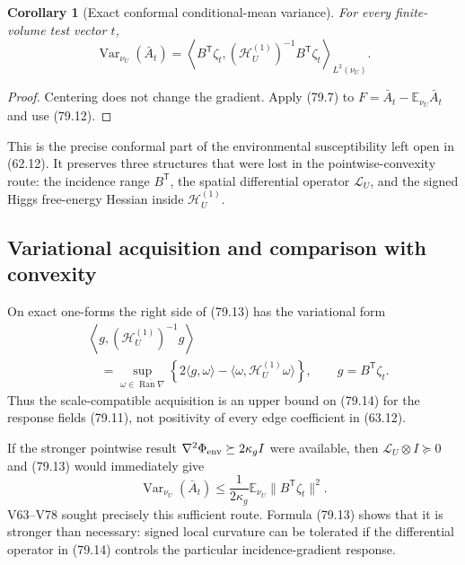 \documentclass[11pt]{article}
\newtheorem{corollary}[theorem]{Corollary}
\theoremstyle{remark}
\begin{document}
\begin{corollary}[Exact conformal conditional-mean variance]
\label{cor:v17v79-response}
For every finite-volume test vector \(t\),
\[
\boxed{
 \operatorname{Var}_{\nu_U}(\bar A_t)
 =\left\langle
 B^{\mathsf T}\zeta_t,
 (\mathscr H_U^{(1)})^{-1}B^{\mathsf T}\zeta_t
 \right\rangle_{L^2(\nu_U)}.}                   \tag{79.13}
\]
\end{corollary}

\begin{proof}
Centering does not change the gradient.  Apply (79.7) to
\(F=\bar A_t-\mathbb E_{\nu_U}\bar A_t\) and use (79.12).
\end{proof}

This is the precise conformal part of the environmental susceptibility
left open in (62.12).  It preserves three structures that were lost in
the pointwise-convexity route: the incidence range
\(B^{\mathsf T}\), the spatial differential operator
\(\mathscr L_U\), and the signed Higgs free-energy Hessian inside
\(\mathscr H_U^{(1)}\).

\subsection{Variational acquisition and comparison with convexity}

On exact one-forms the right side of (79.13) has the variational form
\[
\begin{aligned}
 &\left\langle g,(\mathscr H_U^{(1)})^{-1}g\right\rangle\\
 &\quad=
 \sup_{\omega\in\overline{\operatorname{Ran}\nabla}}
 \left\{2\langle g,\omega\rangle
 -\langle\omega,\mathscr H_U^{(1)}\omega\rangle\right\},
 \qquad g=B^{\mathsf T}\zeta_t.                 \tag{79.14}
\end{aligned}
\]
Thus the scale-compatible acquisition is an upper bound on (79.14)
for the response fields (79.11), not positivity of every edge
coefficient in (63.12).

If the stronger pointwise result
\(\nabla^2\Phi_{\rm env}\succeq2\kappa_gI\) were available, then
\(\mathscr L_U\otimes I\succeq0\) and (79.13) would immediately give
\[
 \operatorname{Var}_{\nu_U}(\bar A_t)
 \leq\frac1{2\kappa_g}
 \mathbb E_{\nu_U}\|B^{\mathsf T}\zeta_t\|^2.   \tag{79.15}
\]
V63--V78 sought precisely this sufficient route.  Formula (79.13)
shows that it is stronger than necessary: signed local curvature can
be tolerated if the differential operator in (79.14) controls the
particular incidence-gradient response.
\end{document}
